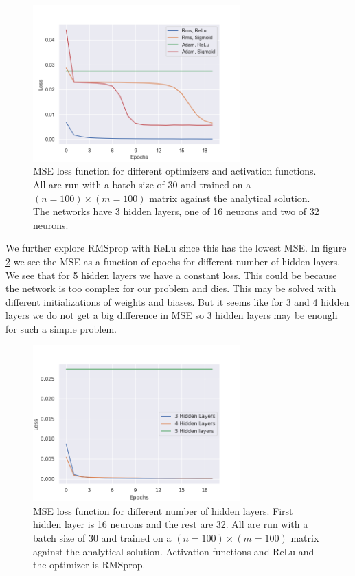 \begin{figure}[h!]
    \centering
    \includegraphics[width=8cm]{../Figures/loss_vs_epochs.png}
    \caption{MSE loss function for different optimizers and activation functions.
    All are run with a batch size of 30 and trained on a $(n=100)\times
    (m=100)$ matrix against the analytical solution. The networks have 3 hidden
    layers, one of 16 neurons and two of 32 neurons.}
    \label{fig:loss_vs_epochs}
\end{figure}

We further explore RMSprop with ReLu since this has the lowest MSE. In figure
\ref{fig:loss_vs_layers} we see the MSE as a function of epochs for different
number of hidden layers. We see that for 5 hidden layers we have a constant
loss. This could be because the network is too complex for our problem and
dies. This may be solved with different initializations of weights and biases.
But it seems like for 3 and 4 hidden layers we do not get a big difference in
MSE so 3 hidden layers may be enough for such a simple problem. 

\begin{figure}[h!]
    \centering
    \includegraphics[width=8cm]{../Figures/loss_vs_layers.png}
    \caption{MSE loss function for different number of hidden layers. First
    hidden layer is 16 neurons and the rest are 32. 
    All are run with a batch size of 30 and trained on a $(n=100)\times
    (m=100)$ matrix against the analytical solution. Activation functions and
    ReLu and the optimizer is RMSprop.}
    \label{fig:loss_vs_layers}
\end{figure}

